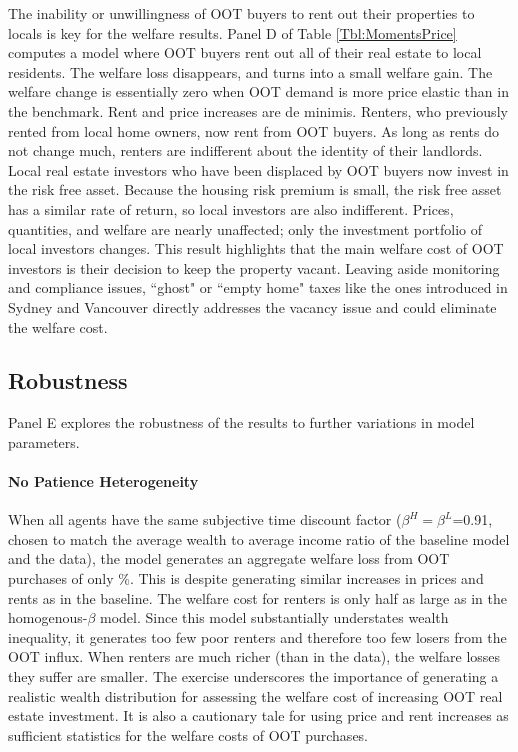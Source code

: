 \documentclass[letterpaper,12pt,dvipsnames,usenames]{article}
\theoremstyle{definition}
\begin{document}
\begin{spacing}{1.25}
{The inability or unwillingness of OOT buyers to rent out their properties to locals is key for the welfare results. Panel D of Table \ref{Tbl:MomentsPrice} computes a model where OOT buyers rent out all of their real estate to local residents. The welfare loss disappears, and turns into a small welfare gain. The welfare change is essentially zero when OOT demand is more price elastic than in the benchmark. Rent and price increases are de minimis. Renters, who previously rented from local home owners, now rent from OOT buyers. As long as rents do not change much, renters are indifferent about the identity of their landlords. Local real estate investors who have been displaced by OOT buyers now invest in the risk free asset. Because the housing risk premium is small, the risk free asset has a similar rate of return, so local investors are also indifferent. Prices, quantities, and welfare are nearly unaffected; only the investment portfolio of local investors changes. This result highlights that the main welfare cost of OOT investors is their decision to keep the property vacant. Leaving aside monitoring and compliance issues,  ``ghost" or ``empty home" taxes like the ones introduced in Sydney and Vancouver directly addresses the vacancy issue and could eliminate the welfare cost.



\subsection{Robustness}

Panel E explores the robustness of the results to further variations in model parameters.

\paragraph{No Patience Heterogeneity}

When all agents have the same subjective time discount factor ($\beta^H=\beta^L$=0.91, chosen to  match the average wealth to average income ratio of the baseline model and the data), the model generates an aggregate welfare loss from  OOT purchases of only  {}\%. This is despite generating similar increases in prices and rents as in the baseline. The welfare cost for renters is only half as large as in the homogenous-$\beta$ model. Since this model substantially understates wealth inequality, it generates too few poor renters and therefore too few losers from the OOT influx. When renters are much richer (than in the data), the welfare losses they suffer are smaller. The exercise underscores the importance of generating a realistic wealth distribution for assessing the  welfare cost of increasing OOT real estate investment. It is also a cautionary tale for using price and rent increases as sufficient statistics for the welfare costs of OOT purchases.

}
\end{spacing}
\end{document}
